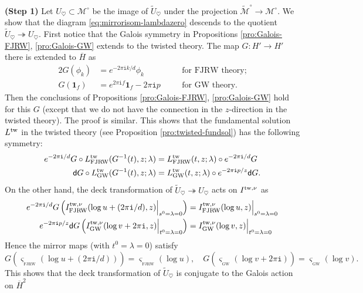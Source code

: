 \documentclass[11pt]{amsart}
\theoremstyle{definition} %
\theoremstyle{remark} %
\newcommand{\tw}{{\rm tw}}
\def\GW{\operatorname{\text{GW}}}
\newcommand{\cM}{\mathcal{M}}
\newcommand{\cMo}{\mathcal{M}^\circ}
\newcommand{\tcMo}{\widetilde{\cM}^\circ}
\newcommand{\dd}{\mathsf{d}}
\newcommand{\unit}{\boldsymbol{1}}
\newcommand{\FJRW}{{\operatorname{FJRW}}}
\newcommand{\sFJRW}{\operatorname{_{FJRW}}}
\renewcommand{\GW}{{\operatorname{GW}}}
\newcommand{\sGW}{\operatorname{_{GW}}}
\newcommand{\tU}{\widetilde{U}}
\newcommand{\ov}{\overline}
\newcommand{\iu}{\mathtt{i}}
\begin{document}
\vspace{5pt} 
\noindent 
{\bf (Step 1)} 
Let $U_\heartsuit\subset \cMo$ be the image of $\tU_\heartsuit$ 
under the projection $\tcMo \to \cMo$. 
We show that the diagram \eqref{eq:mirrorisom-lambdazero} descends to 
the quotient $\tU_\heartsuit \twoheadrightarrow U_\heartsuit$. 
First notice that the Galois symmetry in Propositions 
\ref{pro:Galois-FJRW}, \ref{pro:Galois-GW} extends to 
the twisted theory. The map $G\colon H' \to H'$ there 
is extended to $\ov{H}$ as 
\begin{alignat*}{2}  
G(\phi_k) & = e^{-2\pi\iu k/d} \phi_k  
& \quad & \text{for FJRW theory;} \\ 
G(\unit_f) & = e^{2\pi\iu f} \unit_f - 2\pi\iu p 
& & \text{for GW theory}. 
\end{alignat*} 
Then the conclusions of Propositions \ref{pro:Galois-FJRW}, 
\ref{pro:Galois-GW} hold for this $G$ 
(except that we do not have the connection in the $z$-direction
in the twisted theory). The proof is similar. 
This shows that the fundamental solution $L^\tw$ 
in the twisted theory (see Proposition \ref{pro:twisted-fundsol}) 
has the following symmetry: 
\begin{align*} 
e^{-2\pi\iu/d} G \circ L^\tw_{\FJRW}(G^{-1}(t),z;\lambda) 
& = L^\tw_{\FJRW}(t,z;\lambda) \circ e^{-2\pi\iu/d} G  \\
\dd G \circ L^\tw_{\GW}(G^{-1}(t),z;\lambda) & 
= L^\tw_{\GW}(t,z;\lambda) \circ e^{-2\pi\iu p/z} \dd G.   
\end{align*} 
On the other hand, the deck transformation of 
$\tU_\heartsuit \twoheadrightarrow U_\heartsuit$ acts 
on $I^{\tw,\nu}$ as 
\begin{align*} 
e^{-2\pi\iu/d} G \left( 
I^{\tw, \nu}_{\FJRW}(\log u + (2\pi\iu/d), z)\Bigr|_{s^0=\lambda =0} 
\right)  
& = I^{\tw,\nu}_{\FJRW}(\log u, z)\Bigr|_{s^0= \lambda=0} \\ 
e^{-2\pi\iu p/z} \dd G\left( 
I^{\tw,\nu}_{\GW}(\log v + 2\pi\iu, z)\Bigr|_{t^0=\lambda=0}\right) 
& = I^{\tw,\nu}_{\GW} (\log v, z)\Bigr|_{t^0=\lambda=0}  
\end{align*} 
Hence the mirror maps (with $t^0=\lambda=0$) satisfy 
\begin{equation} 
\label{eq:mirrormap-Galois}
G\left(\varsigma_{\sFJRW}(\log u + (2\pi\iu/d))\right)
= \varsigma_{\sFJRW}(\log u), 
\quad 
G\left(\varsigma_{\sGW}(\log v + 2\pi\iu)\right) = 
\varsigma_{\sGW}(\log v).  
\end{equation} 
This shows that the deck transformation of $\tU_\heartsuit$ 
is conjugate to the Galois action on $\ov{H}^2$ 
\end{document}
